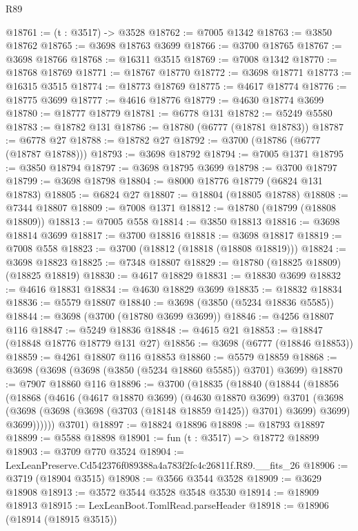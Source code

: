 \begin{lexlean}{R89}
\begin{coremodule}
@18761 := (t : @3517) -> @3528
@18762 := @7005 @1342
@18763 := @3850 @18762
@18765 := @3698 @18763 @3699
@18766 := @3700 @18765
@18767 := @3698 @18766
@18768 := @16311 @3515
@18769 := @7008 @1342
@18770 := @18768 @18769
@18771 := @18767 @18770
@18772 := @3698 @18771
@18773 := @16315 @3515
@18774 := @18773 @18769
@18775 := @4617 @18774
@18776 := @18775 @3699
@18777 := @4616 @18776
@18779 := @4630 @18774 @3699
@18780 := @18777 @18779
@18781 := @6778 @131
@18782 := @5249 @5580
@18783 := @18782 @131
@18786 := @18780 (@6777 (@18781 @18783))
@18787 := @6778 @27
@18788 := @18782 @27
@18792 := @3700 (@18786 (@6777 (@18787 @18788)))
@18793 := @3698 @18792
@18794 := @7005 @1371
@18795 := @3850 @18794
@18797 := @3698 @18795 @3699
@18798 := @3700 @18797
@18799 := @3698 @18798
@18804 := @8000 @18776 @18779 (@6824 @131 @18783)
@18805 := @6824 @27
@18807 := @18804 (@18805 @18788)
@18808 := @7344 @18807
@18809 := @7008 @1371
@18812 := @18780 (@18799 (@18808 @18809))
@18813 := @7005 @558
@18814 := @3850 @18813
@18816 := @3698 @18814 @3699
@18817 := @3700 @18816
@18818 := @3698 @18817
@18819 := @7008 @558
@18823 := @3700 (@18812 (@18818 (@18808 @18819)))
@18824 := @3698 @18823
@18825 := @7348 @18807
@18829 := @18780 (@18825 @18809) (@18825 @18819)
@18830 := @4617 @18829
@18831 := @18830 @3699
@18832 := @4616 @18831
@18834 := @4630 @18829 @3699
@18835 := @18832 @18834
@18836 := @5579 @18807
@18840 := @3698 (@3850 (@5234 @18836 @5585))
@18844 := @3698 (@3700 (@18780 @3699 @3699))
@18846 := @4256 @18807 @116
@18847 := @5249 @18836
@18848 := @4615 @21
@18853 := @18847 (@18848 @18776 @18779 @131 @27)
@18856 := @3698 (@6777 (@18846 @18853))
@18859 := @4261 @18807 @116 @18853
@18860 := @5579 @18859
@18868 := @3698 (@3698 (@3698 (@3850 (@5234 @18860 @5585)) @3701) @3699)
@18870 := @7907 @18860 @116
@18896 := @3700
    (@18835
      (@18840
        (@18844
          (@18856
            (@18868
              (@4616
                (@4617 @18870 @3699)
                (@4630 @18870 @3699)
                @3701
                (@3698
                  (@3698 (@3698 (@3698 (@3703 (@18148 @18859 @1425)) @3701) @3699) @3699)
                  @3699))))))
      @3701)
@18897 := @18824 @18896
@18898 := @18793 @18897
@18899 := @5588 @18898
@18901 := fun (t : @3517) => @18772 @18899
@18903 := @3709 @770 @3524
@18904 := LexLeanPreserve.Cd542376f089388a4a783f2fc4c26811f.R89.__fits_26
@18906 := @3719 (@18904 @3515)
@18908 := @3566 @3544 @3528
@18909 := @3629 @18908
@18913 := @3572 @3544 @3528 @3548 @3530
@18914 := @18909 @18913
@18915 := LexLeanBoot.TomlRead.parseHeader
@18918 := @18906 (@18914 (@18915 @3515))

\end{coremodule}
\end{lexlean}
